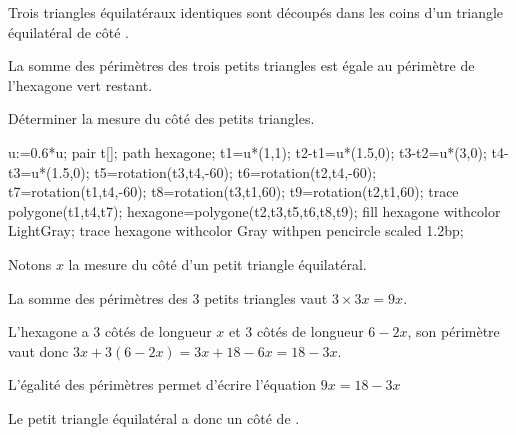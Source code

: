 \begin{corrige}
    Trois triangles équilatéraux identiques sont découpés dans les coins d’un triangle équilatéral de côté .
    
    La somme des périmètres des trois petits triangles est égale au périmètre de l’hexagone vert restant.
    
    Déterminer la mesure du côté des petits triangles.

    \begin{Geometrie}
        u:=0.6*u;
        pair t[];
        path hexagone;
        t1=u*(1,1);
        t2-t1=u*(1.5,0);
        t3-t2=u*(3,0);
        t4-t3=u*(1.5,0);
        t5=rotation(t3,t4,-60);
        t6=rotation(t2,t4,-60);
        t7=rotation(t1,t4,-60);
        t8=rotation(t3,t1,60);
        t9=rotation(t2,t1,60);
        trace polygone(t1,t4,t7);
        hexagone=polygone(t2,t3,t5,t6,t8,t9);
        fill hexagone withcolor LightGray;
        trace hexagone withcolor Gray withpen pencircle scaled 1.2bp;
    \end{Geometrie}

    {\color{red}Notons $x$ la mesure du côté d'un petit triangle équilatéral.
    
    La somme des périmètres des 3 petits triangles vaut $3\times 3x=9x$.
    
    L'hexagone a 3 côtés de longueur $x$ et 3 côtés de longueur $6-2x$, son périmètre vaut donc $3x+3(6-2x)=3x+18-6x=18-3x$.
    
    L'égalité des périmètres permet d'écrire l'équation $9x=18-3x$
    
    
    Le petit triangle équilatéral a donc un côté de .}
\end{corrige}

